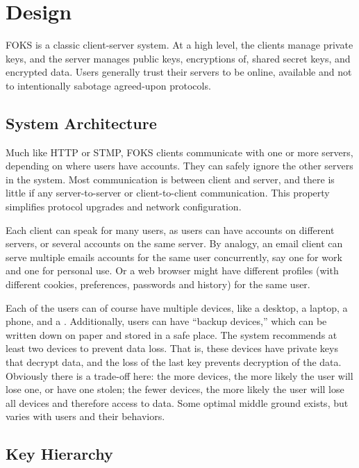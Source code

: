 
\section{Design}
\label{sec:design}

FOKS is a classic client-server system. At a high level, the clients
manage private keys, and the server manages public keys, encryptions of, 
shared secret keys, and encrypted data. Users generally trust their
servers to be online, available and not to intentionally sabotage
agreed-upon protocols. 

\subsection{System Architecture}

Much like HTTP or STMP, FOKS clients communicate with one or more servers,
depending on where users have accounts. They can safely ignore the other servers
in the system. Most communication is between client and server, and there is
little if any server-to-server or client-to-client communication.  This
property simplifies protocol upgrades and network configuration.

Each client can speak for many users, as users can have accounts on different
servers, or several accounts on the same server. By analogy, an email client can
serve multiple emails accounts for the same user concurrently, say one for work
and one for personal use. Or a web browser might have different profiles (with
different cookies, preferences, passwords and history) for the same user.

Each of the users can of course have multiple devices, like a desktop, a laptop,
a phone, and a \yubi . Additionally, users can have ``backup devices,'' which can
be written down on paper and stored in a safe place. The system recommends at
least two devices to prevent data loss. That is, these devices have private keys
that decrypt data, and the loss of the last key prevents decryption of the data.
Obviously there is a trade-off here: the more devices, the more likely the user
will lose one, or have one stolen; the fewer devices, the more likely the user
will lose all devices and therefore access to data. Some optimal middle ground
exists, but varies with users and their behaviors. 

\subsection{Key Hierarchy}


